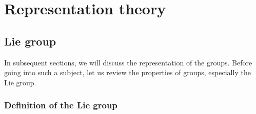 \documentclass[a4paper,pdftex,10pt]{report}
\begin{document}
\maketitle

\tableofcontents

\clearpage
\chapter{Representation theory}



\section{Lie group}

In subsequent sections, we will discuss the representation of the groups. Before going into such a subject, let us review the properties of groups, especially the Lie group.

\subsection{Definition of the Lie group}
\end{document}
